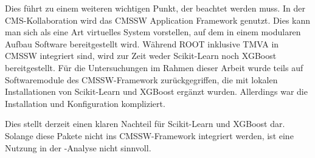 Dies f\"uhrt zu einem weiteren wichtigen Punkt, der beachtet werden muss. In der CMS-Kollaboration wird das CMSSW Application Framework \cite{CMSSW} genutzt. Dies kann man sich als eine Art virtuelles System vorstellen, auf dem in einem modularen Aufbau Software bereitgestellt wird. W\"ahrend ROOT inklusive TMVA in CMSSW integriert sind, wird zur Zeit weder Scikit-Learn noch XGBoost bereitgestellt. F\"ur die Untersuchungen im Rahmen dieser Arbeit wurde teils auf Softwaremodule des CMSSW-Framework zur\"uckgegriffen, die mit lokalen Installationen von Scikit-Learn und XGBoost erg\"anzt wurden. Allerdings war die Installation und Konfiguration kompliziert.

Dies stellt derzeit einen klaren Nachteil f\"ur Scikit-Learn und XGBoost dar. Solange diese Pakete nicht ins CMSSW-Framework integriert werden, ist eine Nutzung in der \ttH-Analyse nicht sinnvoll.